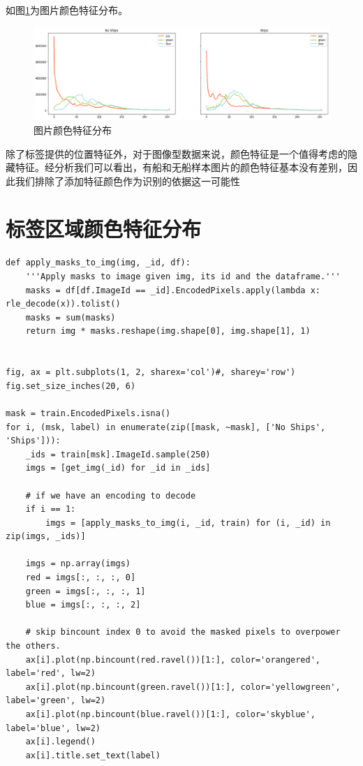 如图\ref{fig::EDA10}为图片颜色特征分布。

\begin{figure}[htbp]
\centering
\includegraphics[width=1\linewidth]{body/EDA_pic/EDA_23_0}
\caption{图片颜色特征分布}
\label{fig::EDA10}
\end{figure}

除了标签提供的位置特征外，对于图像型数据来说，颜色特征是一个值得考虑的隐藏特征。经分析我们可以看出，有船和无船样本图片的颜色特征基本没有差别，因此我们排除了添加特征颜色作为识别的依据这一可能性

\section{标签区域颜色特征分布}\label{ux6807ux7b7eux533aux57dfux989cux8272ux7279ux5f81ux5206ux5e03}

\begin{lstlisting}
def apply_masks_to_img(img, _id, df):
    '''Apply masks to image given img, its id and the dataframe.'''
    masks = df[df.ImageId == _id].EncodedPixels.apply(lambda x: rle_decode(x)).tolist()
    masks = sum(masks)
    return img * masks.reshape(img.shape[0], img.shape[1], 1)


fig, ax = plt.subplots(1, 2, sharex='col')#, sharey='row')
fig.set_size_inches(20, 6)

mask = train.EncodedPixels.isna()
for i, (msk, label) in enumerate(zip([mask, ~mask], ['No Ships', 'Ships'])):
    _ids = train[msk].ImageId.sample(250)
    imgs = [get_img(_id) for _id in _ids]
    
    # if we have an encoding to decode
    if i == 1:
        imgs = [apply_masks_to_img(i, _id, train) for (i, _id) in zip(imgs, _ids)]

    imgs = np.array(imgs)
    red = imgs[:, :, :, 0]
    green = imgs[:, :, :, 1]
    blue = imgs[:, :, :, 2]
    
    # skip bincount index 0 to avoid the masked pixels to overpower the others.
    ax[i].plot(np.bincount(red.ravel())[1:], color='orangered', label='red', lw=2)
    ax[i].plot(np.bincount(green.ravel())[1:], color='yellowgreen', label='green', lw=2)
    ax[i].plot(np.bincount(blue.ravel())[1:], color='skyblue', label='blue', lw=2)
    ax[i].legend()
    ax[i].title.set_text(label)
\end{lstlisting}

